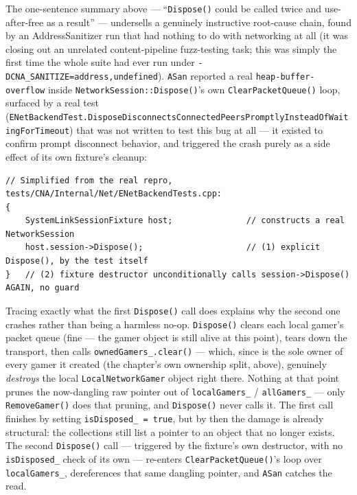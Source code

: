 The one-sentence summary above --- ``\texttt{Dispose()} could be called twice and use-after-free
as a result'' --- undersells a genuinely instructive root-cause chain, found by an
AddressSanitizer run that had nothing to do with networking at all (it was closing out an
unrelated content-pipeline fuzz-testing task; this was simply the first time the whole suite had
ever run under \texttt{-DCNA\_SANITIZE=address,undefined}). \texttt{ASan} reported a real
\texttt{heap-buffer-overflow} inside \texttt{NetworkSession::Dispose()}'s own
\texttt{ClearPacketQueue()} loop, surfaced by a real test
(\texttt{ENetBackendTest.DisposeDisconnectsConnectedPeersPromptlyInsteadOfWaitingForTimeout})
that was not written to test this bug at all --- it existed to confirm prompt disconnect
behavior, and triggered the crash purely as a side effect of its own fixture's cleanup:

\begin{lstlisting}
// Simplified from the real repro, tests/CNA/Internal/Net/ENetBackendTests.cpp:
{
    SystemLinkSessionFixture host;               // constructs a real NetworkSession
    host.session->Dispose();                     // (1) explicit Dispose(), by the test itself
}   // (2) fixture destructor unconditionally calls session->Dispose() AGAIN, no guard
\end{lstlisting}

Tracing exactly what the first \texttt{Dispose()} call does explains why the second one
crashes rather than being a harmless no-op. \texttt{Dispose()} clears each local gamer's packet
queue (fine --- the gamer object is still alive at this point), tears down the transport, then
calls \texttt{ownedGamers\_.clear()} --- which, since  is the sole owner
of every gamer it created (the chapter's own ownership split, above), genuinely
\emph{destroys} the local \texttt{LocalNetworkGamer} object right there. Nothing at that point
prunes the now-dangling raw pointer out of \texttt{localGamers\_} / \texttt{allGamers\_} ---
only \texttt{RemoveGamer()} does that pruning, and \texttt{Dispose()} never calls it. The first
call finishes by setting \texttt{isDisposed\_ = true}, but by then the damage is already
structural: the collections still list a pointer to an object that no longer exists. The second
\texttt{Dispose()} call --- triggered by the fixture's own destructor, with no
\texttt{isDisposed\_} check of its own --- re-enters \texttt{ClearPacketQueue()}'s loop over
\texttt{localGamers\_}, dereferences that same dangling pointer, and \texttt{ASan} catches the
read.

